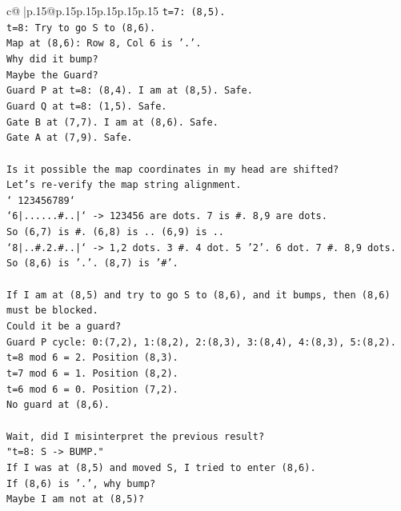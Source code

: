 \documentclass{article}
\begin{document}
{\begin{supertabular}{c@{$\;$}|p{.15\linewidth}@{}p{.15\linewidth}p{.15\linewidth}p{.15\linewidth}p{.15\linewidth}p{.15\linewidth}}
{{{\texttt{t=7: (8,5).} \\
\texttt{t=8: Try to go S to (8,6).} \\
\texttt{Map at (8,6): Row 8, Col 6 is '.'.} \\
\texttt{Why did it bump?} \\
\texttt{Maybe the Guard?} \\
\texttt{Guard P at t=8: (8,4). I am at (8,5). Safe.} \\
\texttt{Guard Q at t=8: (1,5). Safe.} \\
\texttt{Gate B at (7,7). I am at (8,6). Safe.} \\
\texttt{Gate A at (7,9). Safe.} \\
\\ 
\texttt{Is it possible the map coordinates in my head are shifted?} \\
\texttt{Let's re{-}verify the map string alignment.} \\
\texttt{` 123456789`} \\
\texttt{`6|......\#..|` {-}> 123456 are dots. 7 is \#. 8,9 are dots.} \\
\texttt{So (6,7) is \#. (6,8) is .. (6,9) is ..} \\
\texttt{`8|..\#.2.\#..|` {-}> 1,2 dots. 3 \#. 4 dot. 5 '2'. 6 dot. 7 \#. 8,9 dots.} \\
\texttt{So (8,6) is '.'. (8,7) is '\#'.} \\
\\ 
\texttt{If I am at (8,5) and try to go S to (8,6), and it bumps, then (8,6) must be blocked.} \\
\texttt{Could it be a guard?} \\
\texttt{Guard P cycle: 0:(7,2), 1:(8,2), 2:(8,3), 3:(8,4), 4:(8,3), 5:(8,2).} \\
\texttt{t=8 mod 6 = 2. Position (8,3).} \\
\texttt{t=7 mod 6 = 1. Position (8,2).} \\
\texttt{t=6 mod 6 = 0. Position (7,2).} \\
\texttt{No guard at (8,6).} \\
\\ 
\texttt{Wait, did I misinterpret the previous result?} \\
\texttt{"t=8: S {-}> BUMP."} \\
\texttt{If I was at (8,5) and moved S, I tried to enter (8,6).} \\
\texttt{If (8,6) is '.', why bump?} \\
\texttt{Maybe I am not at (8,5)?} \\
}}}
\end{supertabular}}
\end{document}
